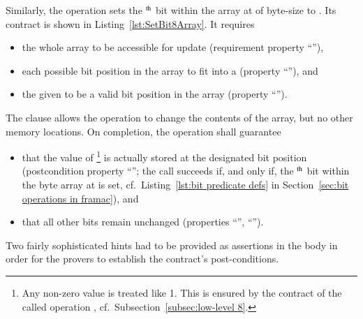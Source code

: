 \FloatBarrier










Similarly, the operation 
sets the
$^{\mbox{\scriptsize th}}$ bit within the array at
 of
byte-size  to .
%
Its contract is shown in Listing~\ref{lst:SetBit8Array}.
%
It requires
%
\begin{itemize}
\item the whole array to be accessible for update (requirement
	property ``''),
\item each possible bit position in the array to fit into a
	 (property ``''), and
\item the given  to be a valid bit position in the array
	(property ``'').
\end{itemize}
%
The  clause allows the operation to change the
contents of the array,
but no other memory locations.
%
On completion, the operation shall guarantee
\begin{itemize}
\item that the value of \footnote{
		Any non-zero  value is treated like 1.
		This is ensured by the contract of the called operation
		, cf.\ Subsection~\ref{subsec:low-level 8}.
	}
	is actually stored at the designated bit
	position (postcondition property ``'';
	the call  succeeds if, and only if, the
	$^{\mbox{\scriptsize th}}$ bit within the byte
	array at  is set, 
	cf.\ Listing~\ref{lst:bit predicate defs} in
	Section~\ref{sec:bit operations in framac}), and
\item that all other bits remain unchanged 
	(properties ``'', ``'').
\end{itemize}
%
Two fairly sophisticated hints had to be provided as assertions in
the body in order for
the provers to establish the contract's post-conditions.









